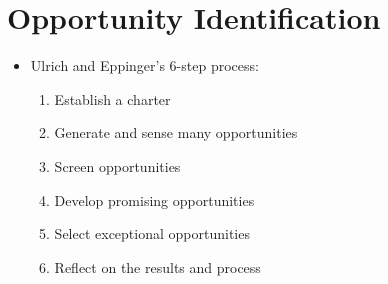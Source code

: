 \documentclass[openany,12pt,a4paper]{book}
\begin{document}
\section{Opportunity Identification}
\begin{itemize}
    \item Ulrich and Eppinger's 6-step process:
    \begin{enumerate}
        \item Establish a charter
        \item Generate and sense many opportunities
        \item Screen opportunities
        \item Develop promising opportunities
        \item Select exceptional opportunities
        \item Reflect on the results and process
    \end{enumerate}
\end{itemize}
\end{document}
